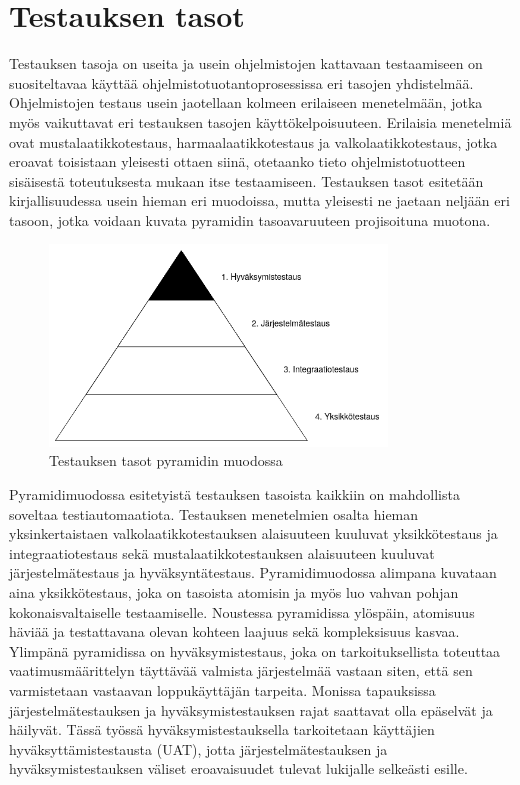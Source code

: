\section{Testauksen tasot} \label{ch:07_testauksen_tasot}

  Testauksen tasoja on useita ja usein ohjelmistojen kattavaan testaamiseen on suositeltavaa käyttää ohjelmistotuotantoprosessissa eri tasojen yhdistelmää.
  Ohjelmistojen testaus usein jaotellaan kolmeen erilaiseen menetelmään, jotka myös vaikuttavat eri testauksen tasojen käyttökelpoisuuteen.
  Erilaisia menetelmiä ovat mustalaatikkotestaus, harmaalaatikkotestaus ja valkolaatikkotestaus, jotka eroavat toisistaan yleisesti ottaen siinä, otetaanko tieto ohjelmistotuotteen sisäisestä toteutuksesta mukaan itse testaamiseen.
  Testauksen tasot esitetään kirjallisuudessa usein hieman eri muodoissa, mutta yleisesti ne jaetaan neljään eri tasoon, jotka voidaan kuvata pyramidin tasoavaruuteen projisoituna muotona.

  \begin{figure}[H]
    \centering
    \includegraphics[width=0.8\textwidth]{assets/testauksen-tasot.png}
    \caption{Testauksen tasot pyramidin muodossa}
    \label{fig:testing-levels-pyramid}
  \end{figure}

  Pyramidimuodossa esitetyistä testauksen tasoista kaikkiin on mahdollista soveltaa testiautomaatiota.
  Testauksen menetelmien osalta hieman yksinkertaistaen valkolaatikkotestauksen alaisuuteen kuuluvat yksikkötestaus ja integraatiotestaus sekä mustalaatikkotestauksen alaisuuteen kuuluvat järjestelmätestaus ja hyväksyntätestaus.
  Pyramidimuodossa alimpana kuvataan aina yksikkötestaus, joka on tasoista atomisin ja myös luo vahvan pohjan kokonaisvaltaiselle testaamiselle.
  Noustessa pyramidissa ylöspäin, atomisuus häviää ja testattavana olevan kohteen laajuus sekä kompleksisuus kasvaa.
  Ylimpänä pyramidissa on hyväksymistestaus, joka on tarkoituksellista toteuttaa vaatimusmäärittelyn täyttävää valmista järjestelmää vastaan siten, että sen varmistetaan vastaavan loppukäyttäjän tarpeita.
  Monissa tapauksissa järjestelmätestauksen ja hyväksymistestauksen rajat saattavat olla epäselvät ja häilyvät.
  Tässä työssä hyväksymistestauksella tarkoitetaan käyttäjien hyväksyttämistestausta (UAT), jotta järjestelmätestauksen ja hyväksymistestauksen väliset eroavaisuudet tulevat lukijalle selkeästi esille.

